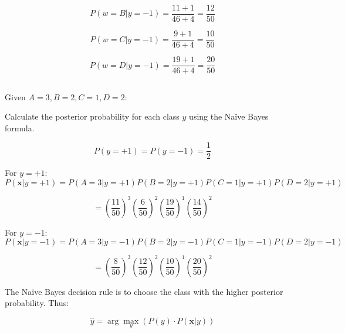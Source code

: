 \documentclass[oneside,solution]{seu-ml-assign}
\begin{document}
\begin{equation}
  P(w = B | y = -1) = \frac{11 + 1}{46 + 4} = \frac{12}{50}
\end{equation}

\begin{equation}
  P(w = C | y = -1) = \frac{9 + 1}{46 + 4} = \frac{10}{50}
\end{equation}

\begin{equation}
  P(w = D | y = -1) = \frac{19 + 1}{46 + 4} = \frac{20}{50}
\end{equation}


\subsection{}

Given \( A = 3, B = 2, C = 1, D = 2 \):

Calculate the posterior probability for each class \( y \) using the Naïve Bayes formula.

\begin{equation}
  P(y = +1) = P(y = -1) = \frac{1}{2}
\end{equation}


For \( y = +1 \):
\begin{equation}
  P(\mathbf{x} | y = +1) = P(A=3 | y = +1) P(B=2 | y = +1) P(C=1 | y = +1) P(D=2 | y = +1)
\end{equation}

\begin{equation}
  = \left( \frac{11}{50} \right)^3 \left( \frac{6}{50} \right)^2 \left( \frac{19}{50} \right)^1 \left( \frac{14}{50} \right)^2
\end{equation}

For \( y = -1 \):
\begin{equation}
  P(\mathbf{x} | y = -1) = P(A=3 | y = -1) P(B=2 | y = -1) P(C=1 | y = -1) P(D=2 | y = -1)
\end{equation}

\begin{equation}
  = \left( \frac{8}{50} \right)^3 \left( \frac{12}{50} \right)^2 \left( \frac{10}{50} \right)^1 \left( \frac{20}{50} \right)^2
\end{equation}

The Naïve Bayes decision rule is to choose the class with the higher posterior probability. Thus:

\begin{equation}
  \hat{y} = \arg\max_{y} \left( P(y) \cdot P(\mathbf{x} | y) \right)
\end{equation}
\end{document}
